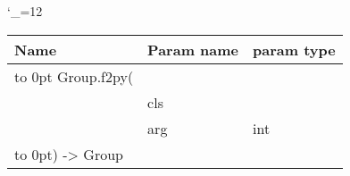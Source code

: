 \begingroup \catcode`\_=12 \tt
\begin{tabular}{lll}
\toprule
\textrm{Name}&\textrm{Param name}&\textrm{param type}\\
\midrule
\hbox to 0pt {Group.f2py(\hss}\\
& cls\\
& arg & int\\
\hbox to 0pt{) -> Group\hss}\\
\bottomrule
\end{tabular}
\endgroup

